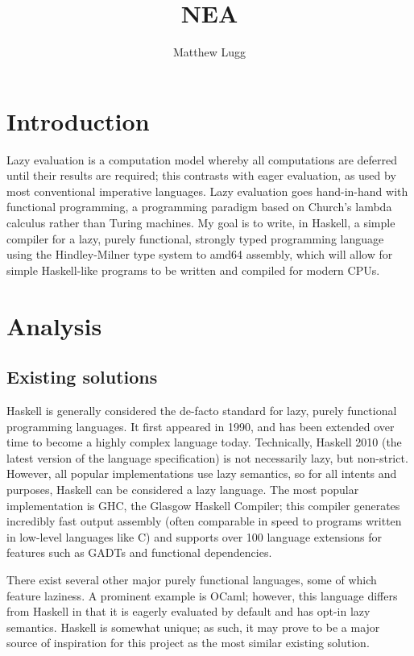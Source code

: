 \documentclass[9pt]{extarticle}
\title{NEA}
\author{Matthew Lugg}
\begin{document}
\maketitle

\newpage

\tableofcontents

\newpage

\section{Introduction}

Lazy evaluation is a computation model whereby all computations are deferred
until their results are required; this contrasts with eager evaluation, as used
by most conventional imperative languages. Lazy evaluation goes hand-in-hand
with functional programming, a programming paradigm based on Church's lambda
calculus rather than Turing machines. My goal is to write, in Haskell, a simple
compiler for a lazy, purely functional, strongly typed programming language
using the Hindley-Milner type system to amd64 assembly, which will allow for
simple Haskell-like programs to be written and compiled for modern CPUs.

\section{Analysis}

\subsection{Existing solutions}

Haskell is generally considered the de-facto standard for lazy, purely
functional programming languages. It first appeared in 1990, and has been
extended over time to become a highly complex language today. Technically,
Haskell 2010 (the latest version of the language specification) is not
necessarily lazy, but non-strict. However, all popular implementations use lazy
semantics, so for all intents and purposes, Haskell can be considered a lazy
language. The most popular implementation is GHC, the Glasgow Haskell Compiler;
this compiler generates incredibly fast output assembly (often comparable in
speed to programs written in low-level languages like C) and supports over 100
language extensions for features such as GADTs and functional dependencies.

There exist several other major purely functional languages, some of which
feature laziness. A prominent example is OCaml; however, this language differs
from Haskell in that it is eagerly evaluated by default and has opt-in lazy
semantics. Haskell is somewhat unique; as such, it may prove to be a major
source of inspiration for this project as the most similar existing solution.
\end{document}
